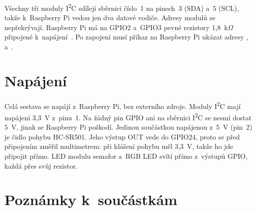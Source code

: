 Všechny tři moduly I\textsuperscript{2}C sdílejí sběrnici číslo~1 na pinech~3 (SDA) a~5 (SCL),
takže k~Raspberry Pi vedou jen dva datové vodiče. Adresy modulů se nepřekrývají. Raspberry Pi má
na GPIO2 a~GPIO3 pevné rezistory 1,8~k$\Omega$ připojené k~napájení~\cite{rpi-hardware}. Po
zapojení musí příkaz  na Raspberry Pi ukázat adresy , 
a~.

\section{Napájení}
\label{sec:napajeni}

Celá sestava se napájí z~Raspberry Pi, bez externího zdroje. Moduly I\textsuperscript{2}C mají
napájení 3,3~V z~pinu~1. Na žádný pin GPIO ani na sběrnici I\textsuperscript{2}C se nesmí dostat
5~V, jinak se Raspberry Pi poškodí. Jedinou součástkou napájenou z~5~V (pin~2) je čidlo pohybu
HC-SR501. Jeho výstup OUT vede do GPIO24, proto se před připojením změřil multimetrem: při
hlášení pohybu měl 3,3~V, takže ho jde připojit přímo. LED modulu semafor a~RGB LED svítí
přímo z~výstupů GPIO, každá přes svůj rezistor.

\section{Poznámky k~součástkám}
\label{sec:poznamky-soucastky}

